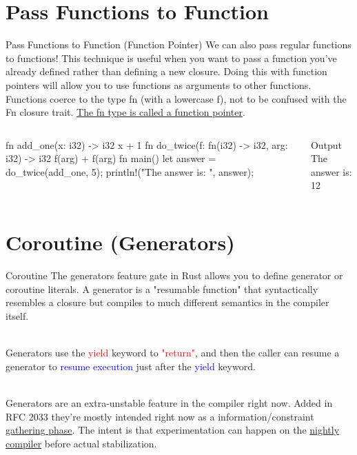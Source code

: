 \documentclass[10pt,xcolor={dvipsnames}, aspectratio=169]{beamer}
\begin{document}
\section{Pass Functions to Function}
    \begin{frame}[fragile]{Pass Functions to Function (Function Pointer)}
        We can also pass regular functions to functions! This technique is useful when you want to pass a function you’ve already defined rather than defining a new closure. Doing this with function pointers will allow you to use functions as arguments to other functions. Functions coerce to the type fn (with a lowercase f), not to be confused with the Fn closure trait. \ul{The fn type is called a function pointer}.
        \begin{columns}[T]
			\begin{column}{0.6 \textwidth}
               \begin{rustcode}
fn add_one(x: i32) -> i32 {
    x + 1
}
fn do_twice(f: fn(i32) -> i32, arg: i32) -> i32 {
    f(arg) + f(arg)
}
fn main() {
    let answer = do_twice(add_one, 5);
    println!("The answer is: {}", answer);
}
                \end{rustcode}
			\end{column}
			\begin{column}{0.4 \textwidth}
				\begin{block}{Output}
					The answer is: 12
				\end{block}
			\end{column}
		\end{columns}
    \end{frame}
    
\section{Coroutine (Generators)}
    \begin{frame}{Coroutine}
        The generators feature gate in Rust allows you to define generator or coroutine literals. A generator is a "resumable function" that syntactically resembles a closure but compiles to much different semantics in the compiler itself. 
        
        ~\\Generators use the \textcolor{red}{yield} keyword to \textcolor{red}{"return"}, and then the caller can resume a generator to \textcolor{blue}{resume execution} just after the \textcolor{blue}{yield} keyword. 
        
        ~\\Generators are an extra-unstable feature in the compiler right now. Added in RFC 2033 they're mostly intended right now as a information/constraint \ul{gathering phase}. The intent is that experimentation can happen on the \ul{nightly compiler} before actual stabilization. 
    \end{frame}
    
\end{document}
